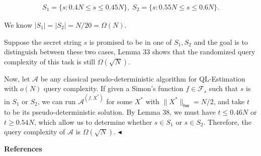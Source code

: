 \documentclass[10pt,a4paper]{article}
\begin{document}
\[\begin{gathered}
S_{1}=\{s:0.4N\leq s\leq 0.45N\},\;S_{2}=\{s:0.55N\leq s\leq 0.6N\}.
\end{gathered}\]


We know $|S_{1}|=|S_{2}|=N/20=\Omega(N)$.\par




Suppose the secret string $s$ is promised to be in one of $S_{1},S_{2}$ and the goal is to distinguish between these two cases, Lemma 33 shows that the randomized query complexity of this task is still $\Omega(\sqrt{N})$.\par




Now, let $\mathcal{A}$ be any classical pseudo-deterministic algorithm for QL-Estimation with $o(N)$ query complexity. If given a Simon’s function $f\in\mathcal{F}_{s}$ such that $s$ is in $S_{1}$ or $S_{2}$, we can run $\mathcal{A}^{(f,X^{*})}$ for some $X^{*}$ with $\|X^{*}\|_{\mathsf{hw}}=N/2$, and take $t$ to be its pseudo-deterministic solution. By Lemma 38, we must have $t\leq 0.46N$ or $t\geq 0.54N$, which allow us to determine whether $s\in S_{1}$ or $s\in S_{2}$. Therefore, the query complexity of $\mathcal{A}$ is $\Omega(\sqrt{N})$.
$\blacktriangleleft$\par








\par\medskip\noindent\textbf{References}\par
\end{document}
